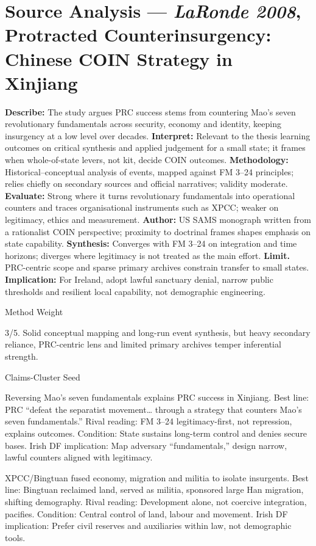 \section*{Source Analysis — \textit{LaRonde 2008}, Protracted Counterinsurgency: Chinese COIN Strategy in Xinjiang}
\textbf{Describe:} The study argues PRC success stems from countering Mao’s seven revolutionary fundamentals across security, economy and identity, keeping insurgency at a low level over decades.
\textbf{Interpret:} Relevant to the thesis learning outcomes on critical synthesis and applied judgement for a small state; it frames when whole-of-state levers, not kit, decide COIN outcomes.
\textbf{Methodology:} Historical–conceptual analysis of events, mapped against FM 3–24 principles; relies chiefly on secondary sources and official narratives; validity moderate.
\textbf{Evaluate:} Strong where it turns revolutionary fundamentals into operational counters and traces organisational instruments such as XPCC; weaker on legitimacy, ethics and measurement.
\textbf{Author:} US SAMS monograph written from a rationalist COIN perspective; proximity to doctrinal frames shapes emphasis on state capability.
\textbf{Synthesis:} Converges with FM 3–24 on integration and time horizons; diverges where legitimacy is not treated as the main effort.
\textbf{Limit.} PRC-centric scope and sparse primary archives constrain transfer to small states.
\textbf{Implication:} For Ireland, adopt lawful sanctuary denial, narrow public thresholds and resilient local capability, not demographic engineering.

Method Weight

3/5. Solid conceptual mapping and long-run event synthesis, but heavy secondary reliance, PRC-centric lens and limited primary archives temper inferential strength.

Claims-Cluster Seed

Reversing Mao’s seven fundamentals explains PRC success in Xinjiang.
Best line: PRC “defeat the separatist movement… through a strategy that counters Mao’s seven fundamentals.”
Rival reading: FM 3–24 legitimacy-first, not repression, explains outcomes.
Condition: State sustains long-term control and denies secure bases.
Irish DF implication: Map adversary “fundamentals,” design narrow, lawful counters aligned with legitimacy.

XPCC/Bingtuan fused economy, migration and militia to isolate insurgents.
Best line: Bingtuan reclaimed land, served as militia, sponsored large Han migration, shifting demography.
Rival reading: Development alone, not coercive integration, pacifies.
Condition: Central control of land, labour and movement.
Irish DF implication: Prefer civil reserves and auxiliaries within law, not demographic tools.

